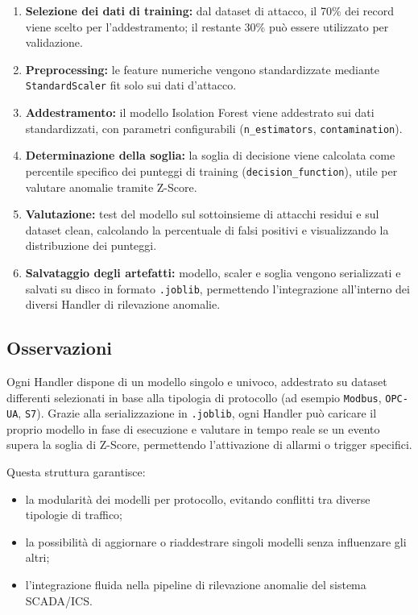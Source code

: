 \begin{enumerate}
    \item \textbf{Selezione dei dati di training:} dal dataset di attacco, il 70\% dei record viene scelto per l'addestramento; il restante 30\% può essere utilizzato per validazione.
    \item \textbf{Preprocessing:} le feature numeriche vengono standardizzate mediante \texttt{StandardScaler} fit solo sui dati d'attacco.
    \item \textbf{Addestramento:} il modello Isolation Forest viene addestrato sui dati standardizzati, con parametri configurabili (\texttt{n\_estimators}, \texttt{contamination}).
    \item \textbf{Determinazione della soglia:} la soglia di decisione viene calcolata come percentile specifico dei punteggi di training (\texttt{decision\_function}), utile per valutare anomalie tramite Z-Score.
    \item \textbf{Valutazione:} test del modello sul sottoinsieme di attacchi residui e sul dataset clean, calcolando la percentuale di falsi positivi e visualizzando la distribuzione dei punteggi.
    \item \textbf{Salvataggio degli artefatti:} modello, scaler e soglia vengono serializzati e salvati su disco in formato \texttt{.joblib}, permettendo l’integrazione all’interno dei diversi Handler di rilevazione anomalie.
\end{enumerate}

\subsection{Osservazioni}

Ogni Handler dispone di un modello singolo e univoco, addestrato su dataset differenti selezionati in base alla tipologia di protocollo (ad esempio \texttt{Modbus}, \texttt{OPC-UA}, \texttt{S7}).  
Grazie alla serializzazione in \texttt{.joblib}, ogni Handler può caricare il proprio modello in fase di esecuzione e valutare in tempo reale se un evento supera la soglia di Z-Score, permettendo l’attivazione di allarmi o trigger specifici.  

Questa struttura garantisce:

\begin{itemize}
    \item la modularità dei modelli per protocollo, evitando conflitti tra diverse tipologie di traffico;
    \item la possibilità di aggiornare o riaddestrare singoli modelli senza influenzare gli altri;
    \item l’integrazione fluida nella pipeline di rilevazione anomalie del sistema SCADA/ICS.
\end{itemize}

